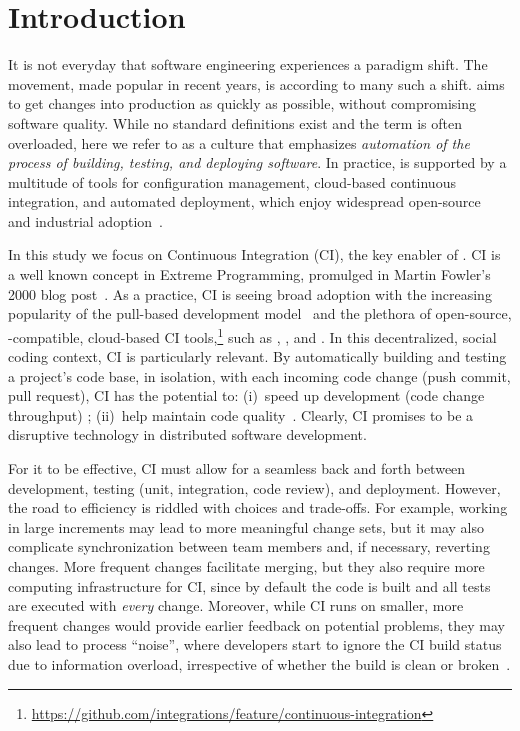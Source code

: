 
\section{Introduction}

It is not everyday that software engineering experiences a paradigm shift.
The \DO movement, made popular in recent years, is according to many
\cite{degrandis2011devops, loukides2012devops, humble2011enterprises, 
roche2013adopting} such a shift.
\DO aims to get changes into production as quickly as 
possible, without compromising software quality.
While no standard definitions exist and the term is often overloaded, here
we refer to \DO as a culture that emphasizes \emph{automation of the 
process of building, testing, and deploying software}.
In practice, \DO is supported by a multitude of tools for configuration management, 
cloud-based continuous integration, and automated deployment,
which enjoy widespread open-source~\cite{Hilton2016} and industrial 
adoption~\cite{rightscale, hilton2016continuous}.

In this study we focus on Continuous Integration (CI), the key enabler of \DO.
CI is a well known concept in Extreme Programming, promulged in 
Martin Fowler's 2000 blog post~\cite{fowler2000continuous}.
As a practice, CI is seeing broad adoption with the increasing popularity
of the \GH pull-based development model~\cite{gousios2014exploratory}
and the plethora of open-source, \GH-compatible, cloud-based CI 
tools,\footnote{\url{https://github.com/integrations/feature/continuous-integration}}
such as \Tvis, \CB, and \CCI.
In this decentralized, social coding context, CI is particularly relevant. 
By automatically building and testing a project's code base, in isolation, 
with each incoming code change (\ie push commit, pull request), CI 
has the potential to: (i)~speed up development (code change throughput)
\cite{Stolberg, pham2013creating, Hilton2016};
(ii)~help maintain code quality~\cite{VasilescuYWDF15, gousios2015work}.
Clearly, CI promises to be a disruptive technology in distributed software
development.

For it to be effective, CI must allow for a seamless back and forth between
development, testing (\eg unit, integration, code review), and deployment. 
However, the road to efficiency is riddled with choices and trade-offs.
For example, working in large increments may lead to more meaningful
change sets, but it may also complicate synchronization between team 
members and, if necessary, reverting changes.
More frequent changes facilitate merging, but they also require more 
computing infrastructure for CI, since by default the code is built and all 
tests are executed with \emph{every} change.
Moreover, while CI runs on smaller, more frequent changes would provide 
earlier feedback on potential problems, they may also lead to process 
``noise'', where developers start to ignore the CI build status due to 
information overload, irrespective of whether the build is clean or 
broken~\cite{DeadCI}.

